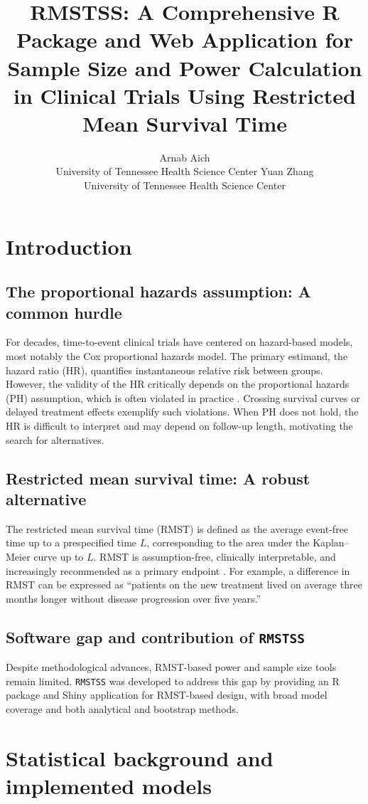 \documentclass[article]{jss}
\title{RMSTSS: A Comprehensive R Package and Web Application for Sample Size and Power Calculation in Clinical Trials Using Restricted Mean Survival Time}
\author{Arnab Aich\\University of Tennessee Health Science Center \And Yuan Zhang\\University of Tennessee Health Science Center}
\begin{document}
\section{Introduction}

\subsection{The proportional hazards assumption: A common hurdle}
For decades, time-to-event clinical trials have centered on hazard-based models, most notably the Cox proportional hazards model. The primary estimand, the hazard ratio (HR), quantifies instantaneous relative risk between groups. However, the validity of the HR critically depends on the proportional hazards (PH) assumption, which is often violated in practice \citep{royston2013, uno2014}. Crossing survival curves or delayed treatment effects exemplify such violations. When PH does not hold, the HR is difficult to interpret and may depend on follow-up length, motivating the search for alternatives.

\subsection{Restricted mean survival time: A robust alternative}
The restricted mean survival time (RMST) is defined as the average event-free time up to a prespecified time $L$, corresponding to the area under the Kaplan–Meier curve up to $L$. RMST is assumption-free, clinically interpretable, and increasingly recommended as a primary endpoint \citep{royston2013, uno2014}. For example, a difference in RMST can be expressed as “patients on the new treatment lived on average three months longer without disease progression over five years.”

\subsection{Software gap and contribution of \texttt{RMSTSS}}
Despite methodological advances, RMST-based power and sample size tools remain limited. \texttt{RMSTSS} was developed to address this gap by providing an R package and Shiny application for RMST-based design, with broad model coverage and both analytical and bootstrap methods.

\section{Statistical background and implemented models}
\end{document}
